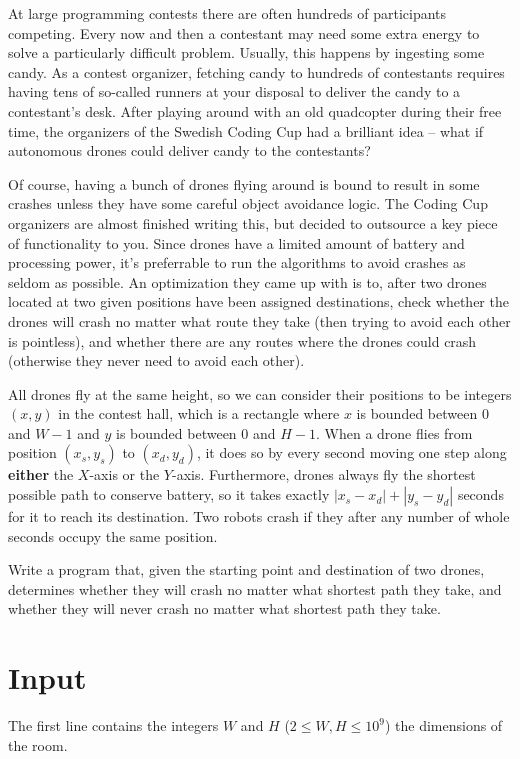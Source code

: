 At large programming contests there are often hundreds of participants competing.
Every now and then a contestant may need some extra energy to solve a particularly difficult problem.
Usually, this happens by ingesting some candy.
As a contest organizer, fetching candy to hundreds of contestants requires having tens of so-called runners at your disposal to deliver the candy to a contestant's desk.
After playing around with an old quadcopter during their free time, the organizers of the Swedish Coding Cup had a brilliant idea -- what if autonomous drones could deliver candy to the contestants?

Of course, having a bunch of drones flying around is bound to result in some crashes unless they have some careful object avoidance logic.
The Coding Cup organizers are almost finished writing this, but decided to outsource a key piece of functionality to you.
Since drones have a limited amount of battery and processing power, it's preferrable to run the algorithms to avoid crashes as seldom as possible.
An optimization they came up with is to, after two drones located at two given positions have been assigned destinations, check whether the drones will crash no matter what route they take (then trying to avoid each other is pointless), and whether there are any routes where the drones could crash (otherwise they never need to avoid each other).

All drones fly at the same height, so we can consider their positions to be integers $(x, y)$ in the contest hall, which is a rectangle where $x$ is bounded between $0$ and $W - 1$ and $y$ is bounded between $0$ and $H - 1$.
When a drone flies from position $(x_s, y_s)$ to $(x_d, y_d)$, it does so by every second moving one step along \textbf{either} the $X$-axis or the $Y$-axis.
Furthermore, drones always fly the shortest possible path to conserve battery, so it takes exactly $|x_s - x_d| + |y_s - y_d|$ seconds for it to reach its destination.
Two robots crash if they after any number of whole seconds occupy the same position.

Write a program that, given the starting point and destination of two drones, determines whether they will crash no matter what shortest path they take, and whether they will never crash no matter what shortest path they take.

\section*{Input}
The first line contains the integers $W$ and $H$ ($2 \le W, H \le 10^9$) the dimensions of the room.


